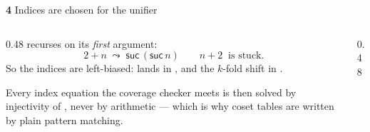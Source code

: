 \begin{frame}{\textbf{4}\; Indices are chosen for the unifier}
\begin{columns}[c]
\begin{column}{0.48\textwidth}
\aid{\_+\_} recurses on its \emph{first} argument:
\[ 2 + n \;\leadsto\; \mathsf{suc}\,(\mathsf{suc}\,n) \qquad n + 2 \;\;\text{is stuck.} \]
So the indices are \alert{left-biased}:  lands in
, and the $k$-fold shift in .
\vspace{6pt}

Every index equation the coverage checker meets is then solved by
\alert{injectivity of }, never by arithmetic --- which is why coset
tables are written by plain pattern matching.
\end{column}
\begin{column}{0.48\textwidth}
\centering
{}
\end{column}
\end{columns}
\end{frame}
